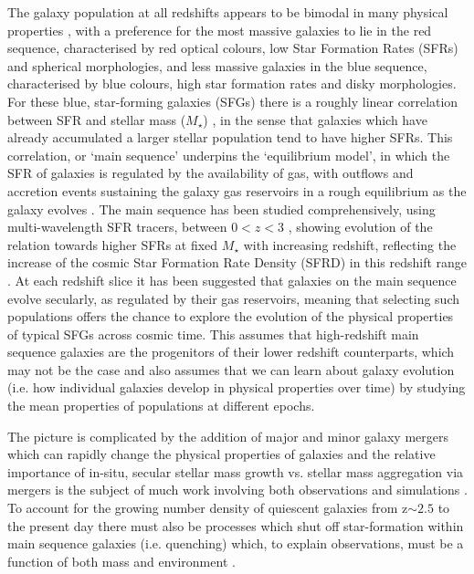 \documentclass[fleqn,usenatbib]{mn2e}
\begin{document}
The galaxy population at all redshifts appears to be bimodal in many physical properties \citep[e.g. as described in][]{Dekel2006}, with a preference for the most massive galaxies to lie in the red sequence, characterised by red optical colours, low Star Formation Rates (SFRs) and spherical morphologies, and less massive galaxies in the blue sequence, characterised by blue colours, high star formation rates and disky morphologies. 
For these blue, star-forming galaxies (SFGs) there is a roughly linear correlation between SFR and stellar mass ($M_{\star}$) \citep[e.g.][]{Daddi2007,Noeske2007,Elbaz2007}, in the sense that galaxies which have already accumulated a larger stellar population tend to have higher SFRs.
This correlation, or `main sequence' underpins the `equilibrium model', in which the SFR of galaxies is regulated by the availability of gas, with outflows and accretion events sustaining the galaxy gas reservoirs in a rough equilibrium as the galaxy evolves \citep[e.g.][]{Dave2012,Lilly2013,Saintonge2013}.
The main sequence has been studied comprehensively, using multi-wavelength SFR tracers, between $0 < z < 3$ \citep[e.g.][]{Rodighiero2011,Karim2011,Whitaker2012,Behroozi2013b,Whitaker2014,Rodighiero2014,Speagle2014,Pannella2014,Sobral2014,Sparre2015,Lee2015,Schreiber2015,Renzini2015,Nelson2016}, showing evolution of the relation towards higher SFRs at fixed $M_{\star}$ with increasing redshift, reflecting the increase of the cosmic Star Formation Rate Density (SFRD) in this redshift range \citep{Madau_2014}.
At each redshift slice it has been suggested that galaxies on the main sequence evolve secularly, as regulated by their gas reservoirs, meaning that selecting such populations offers the chance to explore the evolution of the physical properties of typical SFGs across cosmic time.
This assumes that high-redshift main sequence galaxies are the progenitors of their lower redshift counterparts, which may not be the case \citep[e.g.][]{Gladders2013,Kelson2014,Abramson2016b} and also assumes that we can learn about galaxy evolution (i.e. how individual galaxies develop in physical properties over time) by studying the mean properties of populations at different epochs. 

The picture is complicated by the addition of major and minor galaxy mergers which can rapidly change the physical properties of galaxies \citep[e.g.][]{Toomre1977,Lotz2008,Conselice2011,Conselice2014} and the relative importance of in-situ, secular stellar mass growth vs. stellar mass aggregation via mergers is the subject of much work involving both observations and simulations \citep[e.g.][]{Robaina2009,Kaviraj2012,Stott2013,Lofthouse2016,Qu2016}. 
To account for the growing number density of quiescent galaxies from z$\sim 2.5$ to the present day \citep[e.g.][]{Bell2004,Faber2007,Brown2007,Ilbert2010,Brammer2011,Muzzin2013,Buitrago2013} there must also be processes which shut off star-formation within main sequence galaxies (i.e. quenching) which, to explain observations, must be a function of both mass and environment \citep{Peng2010,Darvish2016}.
\end{document}
